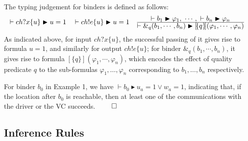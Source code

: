 \documentclass{llncs}
\newcommand{\fracN}[2]{\frac{\small \textstyle #1}{\small \textstyle #2}}
\newcommand{\typeb}[2]{\vdash #1 \blacktriangleright #2}
\newcommand{\semant}[1]{[\!\{#1\}\!]}
\begin{document}
The typing judgement for binders is defined as follows:
\[
\begin{array}{c}
\typeb{ch?x\{u\}}{u=1} \quad \typeb{ch!e\{u\}}{u=1} \quad
\fracN{\typeb{b_1}{\varphi_1}, \ \cdots ,\ \typeb{b_n}{\varphi_n}}{\typeb{\&_q(b_1, \cdots, b_n)}{\semant{q}(\varphi_1, \cdots, \varphi_n)}}
\end{array}\]
As indicated above, for input $ch?x\{u\}$, the successful passing of it gives rise to formula $u=1$, and similarly for
output $ch!e\{u\}$; for binder $\&_q(b_1, \cdots, b_n)$, it gives rise to
formula $\semant{q}(\varphi_1, \cdots, \varphi_n)$, which encodes the effect of quality
predicate $q$ to the sub-formulas $\varphi_1, \ldots, \varphi_n$ corresponding to $b_1, \ldots, b_n$ respectively.

\example
For binder $b_0$ in Example 1, we have
$\typeb{b_0}{u_a = 1 \vee w_a = 1} $,
indicating that, if the location after $b_0$ is reachable, then at least one of the communications with the driver or the VC succeeds. $\qed$


\subsection{Inference Rules}
\end{document}
